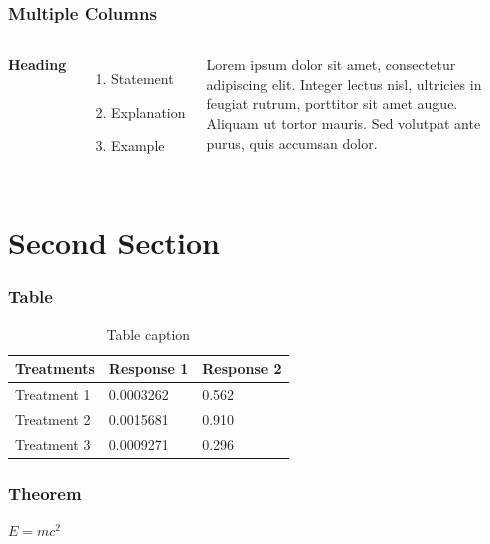 \documentclass{beamer}
\begin{document}

\begin{frame}
\frametitle{Multiple Columns}
\begin{columns}[c] %

\textbf{Heading}
\begin{enumerate}
\item Statement
\item Explanation
\item Example
\end{enumerate}

Lorem ipsum dolor sit amet, consectetur adipiscing elit. Integer lectus nisl, ultricies in feugiat rutrum, porttitor sit amet augue. Aliquam ut tortor mauris. Sed volutpat ante purus, quis accumsan dolor.

\end{columns}
\end{frame}

\section{Second Section}

\begin{frame}
\frametitle{Table}
\begin{table}
\begin{tabular}{l l l}
\toprule
\textbf{Treatments} & \textbf{Response 1} & \textbf{Response 2}\\
\midrule
Treatment 1 & 0.0003262 & 0.562 \\
Treatment 2 & 0.0015681 & 0.910 \\
Treatment 3 & 0.0009271 & 0.296 \\
\bottomrule
\end{tabular}
\caption{Table caption}
\end{table}
\end{frame}


\begin{frame}
\frametitle{Theorem}
\begin{theorem}
$E = mc^2$
\end{theorem}
\end{frame}
\end{document}
